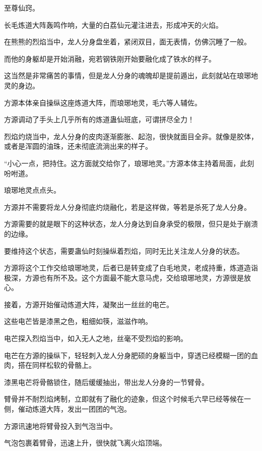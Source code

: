 
\begin{this_body}

至尊仙窍。

长毛炼道大阵轰鸣作响，大量的白荔仙元灌注进去，形成冲天的火焰。

在熊熊的烈焰当中，龙人分身盘坐着，紧闭双目，面无表情，仿佛沉睡了一般。

而他的身躯却是开始消融，宛若钢铁刚开始要融化成了铁水的样子。

这当然是非常痛苦的事情，但是龙人分身的魂魄却是提前遁出，此刻就站在琅琊地灵的身边。

方源本体亲自操纵这座炼道大阵，而琅琊地灵，毛六等人辅佐。

方源调动了手头上几乎所有的炼道蛊仙班底，可谓拼尽全力！

烈焰灼烧当中，龙人分身的皮肉逐渐膨胀、起泡，很快就面目全非。就像是胶体，或者是浑圆的油珠，还未彻底流淌出来的样子。

“小心一点，把持住。这方面就交给你了，琅琊地灵。”方源本体主持着局面，此刻吩咐道。

琅琊地灵点点头。

方源并不需要将龙人分身彻底灼烧融化，若是这样做，等若是杀死了龙人分身。

方源需要的就是眼下的这种状态，龙人分身达到自身承受的极限，但只是处于崩溃的边缘。

要维持这个状态，需要蛊仙时刻操纵着烈焰，同时无比关注龙人分身的状态。

方源将这个工作交给琅琊地灵，后者已是转变成了白毛地灵，老成持重，炼道造诣极深，方源也有所不及。这个方面最不能大意马虎，交给琅琊地灵，方源很是放心。

接着，方源开始催动炼道大阵，凝聚出一丝丝的电芒。

这些电芒皆是漆黑之色，粗细如筷，滋滋作响。

电芒探入烈焰当中，如入无人之地，丝毫不受烈焰的影响。

电芒在方源的操纵下，轻轻刺入龙人分身肥硕的身躯当中，穿透已经模糊一团的血肉，搭在同样松软的骨骼上。

漆黑电芒将骨骼锁住，随后缓缓抽出，带出龙人分身的一节臂骨。

臂骨并不耐烈焰烤制，立即就有了融化的迹象，但这个时候毛六早已经等候在一侧，催动炼道大阵，发出一团团的气泡。

方源讯速地将臂骨投入到气泡当中。

气泡包裹着臂骨，迅速上升，很快就飞离火焰顶端。


\end{this_body}
